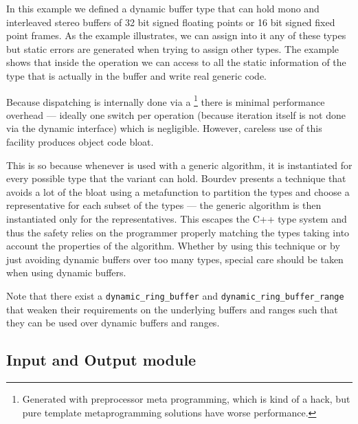 In this example we defined a dynamic buffer type that can hold mono
and interleaved stereo buffers of 32 bit signed floating points or 16
bit signed fixed point frames. As the example illustrates, we can
assign into it any of these types but static errors are generated when
trying to assign other types. The example shows that inside the
 operation we can access to all the static
information of the type that is actually in the buffer and write real
generic code.

Because dispatching is internally done via a
\footnote{Generated with preprocessor meta programming,
  which is kind of a hack, but pure template metaprogramming solutions
  have worse performance.} there is minimal performance overhead ---
ideally one switch per operation (because iteration itself is not done
via the dynamic interface) which is negligible. However, careless use
of this facility produces object code bloat. 

This is so because whenever  is used with a
generic algorithm, it is instantiated for every possible type that the
variant can hold. Bourdev presents a technique
\cite{bourdev11efficient} that avoids a lot of the bloat using a
 metafunction to partition the types and choose a
representative for each subset of the types --- the generic algorithm
is then instantiated only for the representatives. This escapes the
C++ type system and thus the safety relies on the programmer properly
matching the types taking into account the properties of the
algorithm. Whether by using this technique or by just avoiding dynamic
buffers over too many types, special care should be taken when using
dynamic buffers.

Note that there exist a \texttt{dynamic\-\_ring\-\_buffer} and
\texttt{dynamic\-\_ring\-\_buffer\-\_range} that weaken their
requirements on the underlying buffers and ranges such that they can
be used over dynamic buffers and ranges.

\subsection{Input and Output module}
\label{sec:ns-io}

